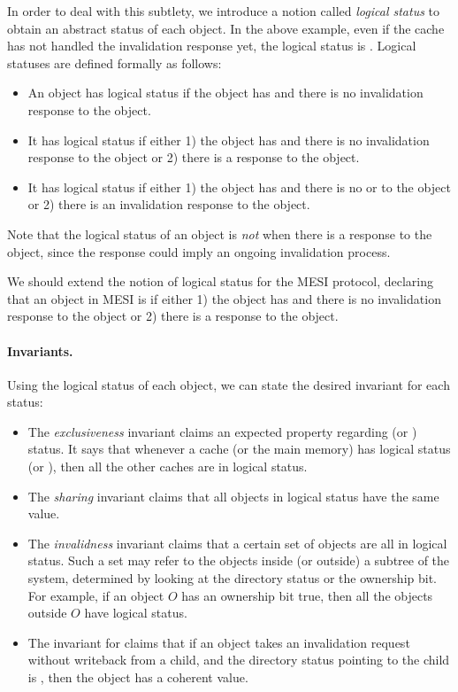 In order to deal with this subtlety, we introduce a notion called \emph{logical status} to obtain an abstract status of each object.
In the above example, even if the cache has not handled the invalidation response yet, the logical status is \stI{}.
Logical statuses are defined formally as follows:
\begin{itemize}[leftmargin=*]
\item An object has logical status \stM{} if the object has \stM{} and there is no invalidation response to the object.
\item It has logical status \stS{} if either 1) the object has \stS{} and there is no invalidation response to the object or 2) there is a response  to the object.
\item It has logical status \stI{} if either 1) the object has \stI{} and there is no  or  to the object or 2) there is an invalidation response  to the object.
\end{itemize}
Note that the logical status of an object is \emph{not} \stM{} when there is a response  to the object, since the response could imply an ongoing invalidation process.

We should extend the notion of logical status for the MESI protocol, declaring that an object in MESI is \stE{} if either 1) the object has \stE{} and there is no invalidation response to the object or 2) there is a response  to the object.

\paragraph{Invariants.}
Using the logical status of each object, we can state the desired invariant for each status:
\begin{itemize}[leftmargin=*]
\item The \emph{exclusiveness} invariant claims an expected property regarding \stM{} (or \stE{}) status. It says that whenever a cache (or the main memory) has logical status \stM{} (or \stE{}), then all the other caches are in logical \stI{} status.
\item The \emph{sharing} invariant claims that all objects in logical \stS{} status have the same value.
\item The \emph{invalidness} invariant claims that a certain set of objects are all in logical \stI{} status. Such a set may refer to the objects inside (or outside) a subtree of the system, determined by looking at the directory status or the ownership bit. For example, if an object $O$ has an ownership bit true, then all the objects outside $O$ have logical \stI{} status.
\item The invariant for \stE{} claims that if an object takes an invalidation request without writeback from a child, and the directory status pointing to the child is \stE{}, then the object has a coherent value.
\end{itemize}

